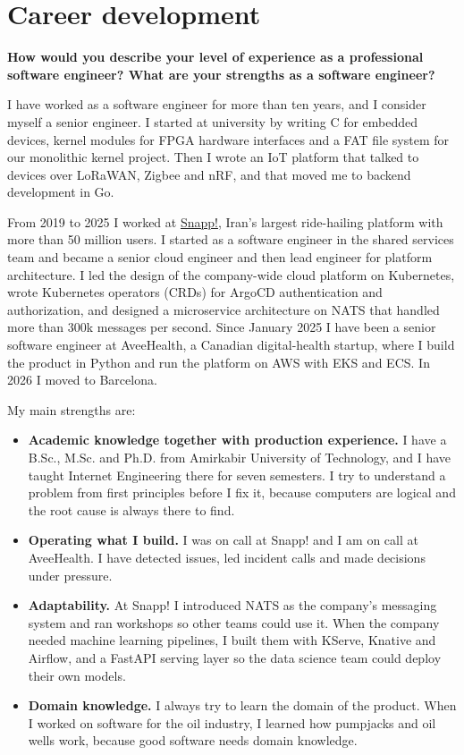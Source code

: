 \tableofcontents

\section{Career development}

\noindent
\textbf{How would you describe your level of experience as a professional software engineer?
What are your strengths as a software engineer?}

I have worked as a software engineer for more than ten years, and I consider myself a senior engineer.
I started at university by writing C for embedded devices, kernel modules for FPGA hardware interfaces and
a FAT file system for our monolithic kernel project. Then I wrote an IoT platform that talked to devices over
LoRaWAN, Zigbee and nRF, and that moved me to backend development in Go.

From 2019 to 2025 I worked at \href{https://snapp.ir}{Snapp!}, Iran's largest ride-hailing platform with more than 50 million users.
I started as a software engineer in the shared services team and became a senior cloud engineer and then lead engineer
for platform architecture. I led the design of the company-wide cloud platform on Kubernetes, wrote Kubernetes operators
(CRDs) for ArgoCD authentication and authorization, and designed a microservice architecture on NATS that handled more than
300k messages per second. Since January 2025 I have been a senior software engineer at AveeHealth, a Canadian digital-health
startup, where I build the product in Python and run the platform on AWS with EKS and ECS. In 2026 I moved to Barcelona.

My main strengths are:

\begin{itemize}
  \item \textbf{Academic knowledge together with production experience.} I have a B.Sc., M.Sc. and Ph.D. from Amirkabir University
    of Technology, and I have taught Internet Engineering there for seven semesters. I try to understand a problem from first principles
    before I fix it, because computers are logical and the root cause is always there to find.
  \item \textbf{Operating what I build.} I was on call at Snapp! and I am on call at AveeHealth. I have detected issues, led incident
    calls and made decisions under pressure.
  \item \textbf{Adaptability.} At Snapp! I introduced NATS as the company's messaging system and ran workshops so other teams could
    use it. When the company needed machine learning pipelines, I built them with KServe, Knative and Airflow, and a FastAPI serving
    layer so the data science team could deploy their own models.
  \item \textbf{Domain knowledge.} I always try to learn the domain of the product. When I worked on software for the oil industry,
    I learned how pumpjacks and oil wells work, because good software needs domain knowledge.
\end{itemize}

